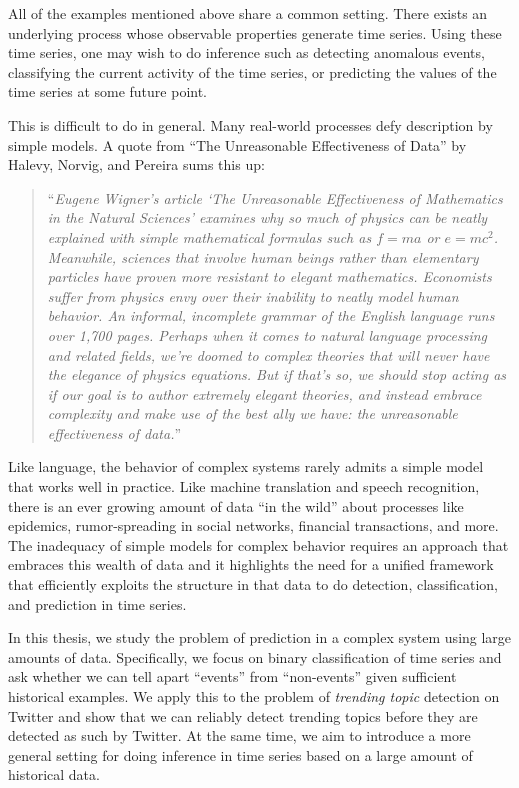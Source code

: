 All of the examples mentioned above share a common setting. There exists an
underlying process whose observable properties generate time series. Using these
time series, one may wish to do inference such as detecting anomalous events,
classifying the current activity of the time series, or predicting the values of
the time series at some future point.

This is difficult to do in general. Many real-world processes defy description
by simple models. A quote from ``The Unreasonable Effectiveness of
Data''\cite{Halevy} by Halevy, Norvig, and Pereira sums this up:
\begin{quote}
``{\em Eugene Wigner's article `The Unreasonable Effectiveness of Mathematics in
    the Natural Sciences' examines why so much of physics can be neatly
    explained with simple mathematical formulas such as $f = ma$ or $e =
    mc^2$. Meanwhile, sciences that involve human beings rather than elementary
    particles have proven more resistant to elegant mathematics. Economists
    suffer from physics envy over their inability to neatly model human
    behavior. An informal, incomplete grammar of the English language runs over
    1,700 pages. Perhaps when it comes to natural language processing and
    related fields, we're doomed to complex theories that will never have the
    elegance of physics equations. But if that's so, we should stop acting as if
    our goal is to author extremely elegant theories, and instead embrace
    complexity and make use of the best ally we have: the unreasonable
    effectiveness of data.}''
\end{quote}

Like language, the behavior of complex systems rarely admits a simple model that
works well in practice. Like machine translation and speech recognition, there
is an ever growing amount of data ``in the wild'' about processes like
epidemics, rumor-spreading in social networks, financial transactions, and
more. The inadequacy of simple models for complex behavior requires an approach
that embraces this wealth of data and it highlights the need for a unified
framework that efficiently exploits the structure in that data to do detection,
classification, and prediction in time series.

In this thesis, we study the problem of prediction in a complex system using
large amounts of data. Specifically, we focus on binary classification of time
series and ask whether we can tell apart ``events'' from ``non-events'' given
sufficient historical examples. We apply this to the problem of {\em trending
  topic} detection on Twitter and show that we can reliably detect trending
topics before they are detected as such by Twitter. At the same time, we aim to
introduce a more general setting for doing inference in time series based on a
large amount of historical data.

